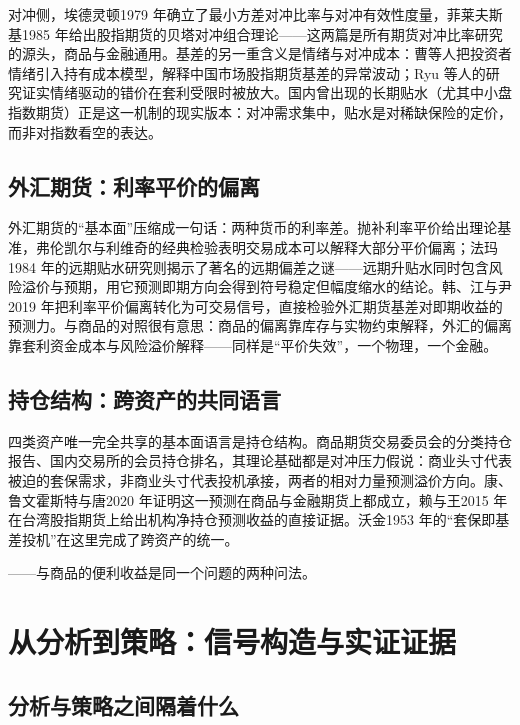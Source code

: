 \documentclass[12pt,a4paper]{ctexart}
\begin{document}
对冲侧，埃德灵顿1979 年确立了最小方差对冲比率与对冲有效性度量\cite{75}，菲莱夫斯基1985 年给出股指期货的贝塔对冲组合理论\cite{76}——这两篇是所有期货对冲比率研究的源头，商品与金融通用。基差的另一重含义是情绪与对冲成本：曹等人把投资者情绪引入持有成本模型，解释中国市场股指期货基差的异常波动\cite{84}；Ryu 等人的研究证实情绪驱动的错价在套利受限时被放大\cite{85}。国内曾出现的长期贴水（尤其中小盘指数期货）正是这一机制的现实版本：对冲需求集中，贴水是对稀缺保险的定价，而非对指数看空的表达。

\subsection{外汇期货：利率平价的偏离}

外汇期货的“基本面”压缩成一句话：两种货币的利率差。抛补利率平价给出理论基准，弗伦凯尔与利维奇的经典检验表明交易成本可以解释大部分平价偏离\cite{82}；法玛1984 年的远期贴水研究则揭示了著名的远期偏差之谜——远期升贴水同时包含风险溢价与预期，用它预测即期方向会得到符号稳定但幅度缩水的结论\cite{81}。韩、江与尹2019 年把利率平价偏离转化为可交易信号，直接检验外汇期货基差对即期收益的预测力\cite{83}。与商品的对照很有意思：商品的偏离靠库存与实物约束解释，外汇的偏离靠套利资金成本与风险溢价解释——同样是“平价失效”，一个物理，一个金融。

\subsection{持仓结构：跨资产的共同语言}

四类资产唯一完全共享的基本面语言是持仓结构。商品期货交易委员会的分类持仓报告、国内交易所的会员持仓排名，其理论基础都是对冲压力假说\cite{09, 10}：商业头寸代表被迫的套保需求，非商业头寸代表投机承接，两者的相对力量预测溢价方向。康、鲁文霍斯特与唐2020 年证明这一预测在商品与金融期货上都成立\cite{38}，赖与王2015 年在台湾股指期货上给出机构净持仓预测收益的直接证据\cite{86}。沃金1953 年的“套保即基差投机”在这里完成了跨资产的统一\cite{04}。

——与商品的便利收益是同一个问题的两种问法。

\section{从分析到策略：信号构造与实证证据}

\subsection{分析与策略之间隔着什么}
\end{document}

